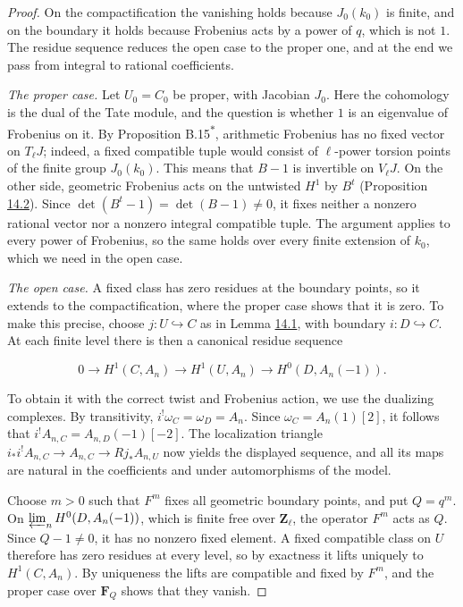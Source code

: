 \documentclass[11pt]{article}
\newcommand{\bpout}[1]{#1\textsuperscript{\hyperlink{bp-outside}{\ensuremath{\ast}}}}
\begin{document}
\begin{proof}[{Proof}]\label{bp52}%
On the compactification the vanishing holds because \(J_0(k_0)\) is finite, and on the boundary it holds because Frobenius acts by a power of \(q\), which is not \(1\). The residue sequence reduces the open case to the proper one, and at the end we pass from integral to rational coefficients.

\emph{The proper case.} Let \(U_0=C_0\) be proper, with Jacobian \(J_0\). Here the cohomology is the dual of the Tate module, and the question is whether \(1\) is an eigenvalue of Frobenius on it.  By Proposition \bpout{B.15}, arithmetic Frobenius has no fixed vector on \(T_\ell J\); indeed, a fixed compatible tuple would consist of \(\ell\)-power torsion points of the finite group \(J_0(k_0)\). This means that \(B-1\) is invertible on \(V_\ell J\).  On the other side, geometric Frobenius acts on the untwisted \(H^1\) by \(B^t\) (Proposition \hyperref[bp48]{14.2}). Since \(\det(B^t-1)=\det(B-1)\ne0\), it fixes neither a nonzero rational vector nor a nonzero integral compatible tuple.  The argument applies to every power of Frobenius, so the same holds over every finite extension of \(k_0\), which we need in the open case.

\emph{The open case.} A fixed class has zero residues at the boundary points, so it extends to the compactification, where the proper case shows that it is zero. To make this precise, choose \(j:U\hookrightarrow C\) as in Lemma \hyperref[bp45]{14.1}, with boundary \(i:D\hookrightarrow C\). At each finite level there is then a canonical residue sequence

\[
0\longrightarrow H^1(C,A_n)\longrightarrow H^1(U,A_n)
\longrightarrow H^0(D,A_n(-1)).
\]

To obtain it with the correct twist and Frobenius action, we use the dualizing complexes.  By transitivity, \(i^!\omega_C=\omega_D=A_n\). Since \(\omega_C=A_n(1)[2]\), it follows that \(i^!A_{n,C}=A_{n,D}(-1)[-2]\).  The localization triangle \(i_*i^!A_{n,C}\to A_{n,C}\to Rj_*A_{n,U}\) now yields the displayed sequence, and all its maps are natural in the coefficients and under automorphisms of the model.

Choose \(m>0\) such that \(F^m\) fixes all geometric boundary points, and put \(Q=q^m\).  On \(\varprojlim_nH^0(D,A_n(-1))\), which is finite free over \(\mathbf Z_\ell\), the operator \(F^m\) acts as \(Q\). Since \(Q-1\ne0\), it has no nonzero fixed element. A fixed compatible class on \(U\) therefore has zero residues at every level, so by exactness it lifts uniquely to \(H^1(C,A_n)\). By uniqueness the lifts are compatible and fixed by \(F^m\), and the proper case over \(\mathbf F_Q\) shows that they vanish.


\end{proof}
\end{document}
